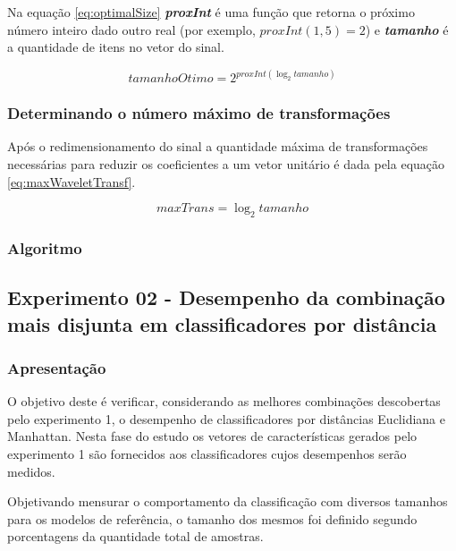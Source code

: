 				\par Na equação \ref{eq:optimalSize} \textit{\textbf{proxInt}} é uma função que retorna o próximo número inteiro dado outro real (por exemplo, $proxInt(1,5) = 2$) e \textit{\textbf{tamanho}} é a quantidade de itens no vetor do sinal.

				\begin{equation}
					tamanhoOtimo=2^{proxInt(\log_{2}tamanho)}
					\label{eq:optimalSize}
				\end{equation} 
			
			\subsubsection{Determinando o número máximo de transformações}
				\par Após o redimensionamento do sinal a quantidade máxima de transformações necessárias para reduzir os coeficientes a um vetor unitário é dada pela equação \ref{eq:maxWaveletTransf}. 
				
				\begin{equation}
					maxTrans=\log_{2}tamanho
					\label{eq:maxWaveletTransf}
				\end{equation}


			\subsubsection{Algoritmo}
			

		\subsection{Experimento 02 - Desempenho da combinação mais disjunta em classificadores por distância}
		\label{chap:propApproach:sec:Experimento01}
			\subsubsection{Apresentação}
				\par O objetivo deste é verificar, considerando as melhores combinações descobertas pelo experimento 1, o desempenho de classificadores por distâncias Euclidiana e Manhattan. Nesta fase do estudo os vetores de características gerados pelo experimento 1 são fornecidos aos classificadores cujos desempenhos serão medidos.
				
				\par Objetivando mensurar o comportamento da classificação com diversos tamanhos para os modelos de referência, o tamanho dos mesmos foi definido segundo porcentagens da quantidade total de amostras.
				
